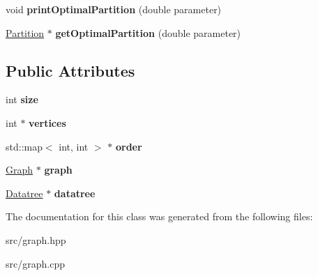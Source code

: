 \begin{DoxyCompactItemize}
\item 
\hypertarget{classGraphComponent_af642a5a15cdbd4c07daea39fafdc9fb1}{void {\bfseries print\-Optimal\-Partition} (double parameter)}\label{classGraphComponent_af642a5a15cdbd4c07daea39fafdc9fb1}

\item 
\hypertarget{classGraphComponent_abed6e50213ba351bb2d0d155710e8be4}{\hyperlink{classPartition}{Partition} $\ast$ {\bfseries get\-Optimal\-Partition} (double parameter)}\label{classGraphComponent_abed6e50213ba351bb2d0d155710e8be4}

\end{DoxyCompactItemize}
\subsection*{Public Attributes}
\begin{DoxyCompactItemize}
\item 
\hypertarget{classGraphComponent_a3624962766b1475e0a93fdd47e7f736c}{int {\bfseries size}}\label{classGraphComponent_a3624962766b1475e0a93fdd47e7f736c}

\item 
\hypertarget{classGraphComponent_add037336c58d88b648e63f2532e2506b}{int $\ast$ {\bfseries vertices}}\label{classGraphComponent_add037336c58d88b648e63f2532e2506b}

\item 
\hypertarget{classGraphComponent_a4a3df3b388cb8fb288e74029ab7a0806}{std\-::map$<$ int, int $>$ $\ast$ {\bfseries order}}\label{classGraphComponent_a4a3df3b388cb8fb288e74029ab7a0806}

\item 
\hypertarget{classGraphComponent_ac12552650f43a1e2d13ddab6ce42ee75}{\hyperlink{classGraph}{Graph} $\ast$ {\bfseries graph}}\label{classGraphComponent_ac12552650f43a1e2d13ddab6ce42ee75}

\item 
\hypertarget{classGraphComponent_a53b6f7f9857c4cbf3232ec04d2b2d6ce}{\hyperlink{classDatatree}{Datatree} $\ast$ {\bfseries datatree}}\label{classGraphComponent_a53b6f7f9857c4cbf3232ec04d2b2d6ce}

\end{DoxyCompactItemize}


The documentation for this class was generated from the following files\-:\begin{DoxyCompactItemize}
\item 
src/graph.\-hpp\item 
src/graph.\-cpp\end{DoxyCompactItemize}
